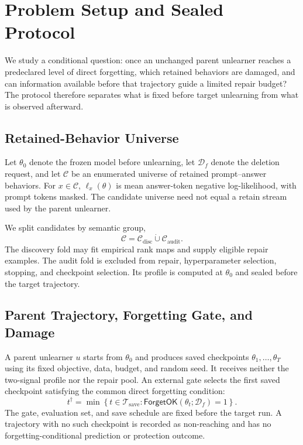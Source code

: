 \section{Problem Setup and Sealed Protocol}
\label{sec:setup}

We study a conditional question: once an unchanged parent unlearner reaches a
predeclared level of direct forgetting, which retained behaviors are damaged,
and can information available before that trajectory guide a limited repair
budget? The protocol therefore separates what is fixed before target
unlearning from what is observed afterward.

\subsection{Retained-Behavior Universe}


Let $\theta_0$ denote the frozen model before unlearning, let $\mathcal D_f$
denote the deletion request, and let $\mathcal C$ be an enumerated universe of
retained prompt--answer behaviors. For $x\in\mathcal C$, $\ell_x(\theta)$ is
mean answer-token negative log-likelihood, with prompt tokens masked. The
candidate universe need not equal a retain stream used by the parent
unlearner.

We split candidates by semantic group,
\begin{equation}
  \mathcal C
  =
  \mathcal C_{\mathrm{disc}}
  \mathbin{\dot\cup}
  \mathcal C_{\mathrm{audit}} .
  \label{eq:candidate-split}
\end{equation}
The discovery fold may fit empirical rank maps and supply eligible repair
examples. The audit fold is excluded from repair, hyperparameter selection,
stopping, and checkpoint selection. Its profile is computed at $\theta_0$ and
sealed before the target trajectory.

\subsection{Parent Trajectory, Forgetting Gate, and Damage}

A parent unlearner $u$ starts from $\theta_0$ and produces saved checkpoints
$\theta_1,\ldots,\theta_T$ using its fixed objective, data, budget, and random
seed. It receives neither the two-signal profile nor the repair pool. An
external gate selects the first saved checkpoint satisfying the common direct
forgetting condition:
\begin{equation}
  t^\dagger
  =
  \min\!\left\{
    t\in\mathcal T_{\mathrm{save}}:
    \mathsf{ForgetOK}(\theta_t;\mathcal D_f)=1
  \right\}.
  \label{eq:forgetting-gate}
\end{equation}
The gate, evaluation set, and save schedule are fixed before the target run.
A trajectory with no such checkpoint is recorded as non-reaching and has no
forgetting-conditional prediction or protection outcome.


